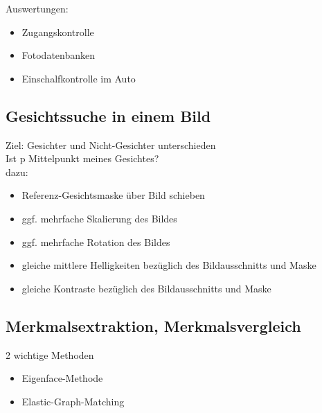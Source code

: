 \documentclass[a4paper,12pt]{scrreprt}
\begin{document}
Auswertungen:
\begin{itemize}
 \item Zugangskontrolle
 \item Fotodatenbanken
 \item Einschalfkontrolle im Auto
\end{itemize}

\subsection{Gesichtssuche in einem Bild}

Ziel: Gesichter und Nicht-Gesichter unterschieden \\
Ist p Mittelpunkt meines Gesichtes?\\
dazu: 
\begin{itemize}
 \item Referenz-Gesichtsmaske über Bild schieben
 \item ggf. mehrfache Skalierung des Bildes
 \item ggf. mehrfache Rotation des Bildes
 \item gleiche mittlere Helligkeiten bezüglich des Bildausschnitts und Maske
 \item gleiche Kontraste bezüglich des Bildausschnitts und Maske
\end{itemize}

\subsection{Merkmalsextraktion, Merkmalsvergleich}

2 wichtige Methoden
\begin{itemize}
 \item Eigenface-Methode
 \item Elastic-Graph-Matching
\end{itemize}
\end{document}
